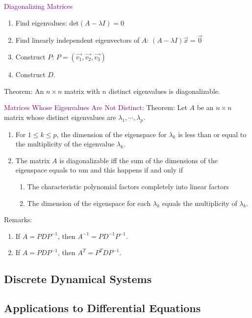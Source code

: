 \documentclass[12pt]{article}
\begin{document}
\textcolor{purple}{Diagonalizing Matrices}
\begin{enumerate}
    \item Find eigenvalues: $\text{det}(A-\lambda I) = 0$
    \item Find linearly independent eigenvectors of $A$: $(A-\lambda I)\vec{x} = \vec{0}$
    \item Construct $P$: $P = (\vec{v_1}, \vec{v_2}, \vec{v_3})$
    \item Construct $D$.
\end{enumerate}

Theorem: An $n\times n$ matrix with $n$ distinct eigenvalues is diagonalizable.

\textcolor{purple}{Matrices Whose Eigenvalues Are Not Distinct}:
Theorem: Let $A$ be an $n\times n$ matrix whose distinct eigenvalues are $\lambda_1, \cdots, \lambda_p$.
\begin{enumerate}
    \item For $1\leq k \leq p$, the dimension of the eigenspace for $\lambda_k$ is less than or equal to the multiplicity of the eigenvalue $\lambda_k$.
    \item The matrix $A$ is diagonalizable iff the sum of the dimensions of the eigenspace equals to $n$m and this happens if and only if \begin{enumerate}
        \item The characteristic polynomial factors completely into linear factors
        \item The dimension of the eigenspace for each $\lambda_k$ equals the multiplicity of $\lambda_k$.
    \end{enumerate}
\end{enumerate}


Remarks: 
\begin{enumerate}
    \item If $A = PDP^{-1}$, then $A^{-1} = PD^{-1}P^{-1}$.
    \item If $A = PDP^{-1}$, then $A^{T} = P^TDP^{-1}$.
\end{enumerate}



\subsection{Discrete Dynamical Systems}
\subsection{Applications to Differential Equations}
\end{document}
